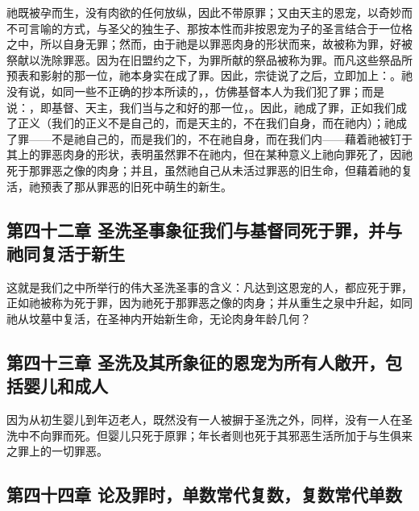 祂既被孕而生，没有肉欲的任何放纵，因此不带原罪；又由天主的恩宠，以奇妙而不可言喻的方式，与圣父的独生子、那按本性而非按恩宠为子的圣言结合于一位格之中，所以自身无罪；然而，由于祂是以罪恶肉身的形状而来，故被称为罪，好被祭献以洗除罪恶。因为在旧盟约之下，为罪所献的祭品被称为罪。而凡这些祭品所预表和影射的那一位，祂本身实在成了罪。因此，宗徒说了之后，立即加上：。祂没有说，如同一些不正确的抄本所读的，，仿佛基督本人为我们犯了罪；而是说：，即基督、天主，我们当与之和好的那一位，。因此，祂成了罪，正如我们成了正义（我们的正义不是自己的，而是天主的，不在我们自身，而在祂内）；祂成了罪——不是祂自己的，而是我们的，不在祂自身，而在我们内——藉着祂被钉于其上的罪恶肉身的形状，表明虽然罪不在祂内，但在某种意义上祂向罪死了，因祂死于那罪恶之像的肉身；并且，虽然祂自己从未活过罪恶的旧生命，但藉着祂的复活，祂预表了那从罪恶的旧死中萌生的新生。\par


\subsection{第四十二章 圣洗圣事象征我们与基督同死于罪，并与祂同复活于新生}

这就是我们之中所举行的伟大圣洗圣事的含义：凡达到这恩宠的人，都应死于罪，正如祂被称为死于罪，因为祂死于那罪恶之像的肉身；并从重生之泉中升起，如同祂从坟墓中复活，在圣神内开始新生命，无论肉身年龄几何？\par


\subsection{第四十三章 圣洗及其所象征的恩宠为所有人敞开，包括婴儿和成人}

因为从初生婴儿到年迈老人，既然没有一人被摒于圣洗之外，同样，没有一人在圣洗中不向罪而死。但婴儿只死于原罪；年长者则也死于其邪恶生活所加于与生俱来之罪上的一切罪恶。\par


\subsection{第四十四章 论及罪时，单数常代复数，复数常代单数}

